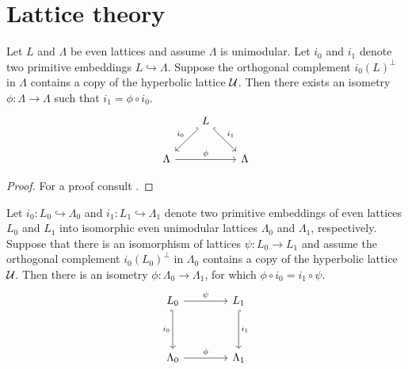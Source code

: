 \section{Lattice theory}

\begin{proposition}
    \label{extending an isometry 1}
    Let $L$ and $\Lambda$ be even lattices and assume $\Lambda$ is unimodular. Let $i_0$ and $i_1$ denote two primitive embeddings $L \hookrightarrow \Lambda$. Suppose the orthogonal complement $i_0(L)^\perp$ in $\Lambda$ contains a copy of the hyperbolic lattice $\mathcal U$. Then there exists an isometry $\phi \colon \Lambda \to \Lambda$ such that $i_1 = \phi \circ i_0$.
    \[\begin{tikzcd}[row sep = 1em, column sep = 2em]
        & L \\
        \\
        \Lambda && \Lambda
        \arrow["{i_0}"', hook', from=1-2, to=3-1]
        \arrow["{i_1}", hook, from=1-2, to=3-3]
        \arrow["\phi", from=3-1, to=3-3]
    \end{tikzcd}\]
\end{proposition}

\begin{proof}
    For a proof consult \cite[text]{keylist}.
\end{proof}

\begin{corollary}
    \label{extending an isometry 2}
    Let $i_0 \colon L_0 \hookrightarrow \Lambda_0$ and $i_1 \colon L_1 \hookrightarrow \Lambda_1$ denote two primitive embeddings of even lattices $L_0$ and $L_1$ into isomorphic even unimodular lattices $\Lambda_0$ and $\Lambda_1$, respectively. Suppose that there is an isomorphism of lattices $\psi \colon L_0 \to L_1$ and assume the orthogonal complement $i_0(L_0)^\perp$ in $\Lambda_0$ contains a copy of the hyperbolic lattice $\mathcal U$. Then there is an isometry $\phi \colon \Lambda_0 \to \Lambda_1$, for which $\phi \circ i_0 = i_1 \circ \psi$.
    \[\begin{tikzcd}[column sep = 2em]
        {L_0} && {L_1} \\
        \\
        \Lambda_0 && \Lambda_1
        \arrow["\psi", from=1-1, to=1-3]
        \arrow["{i_0}"', hook', from=1-1, to=3-1]
        \arrow["{i_1}", hook, from=1-3, to=3-3]
        \arrow["\phi", from=3-1, to=3-3]
    \end{tikzcd}\]
\end{corollary}

